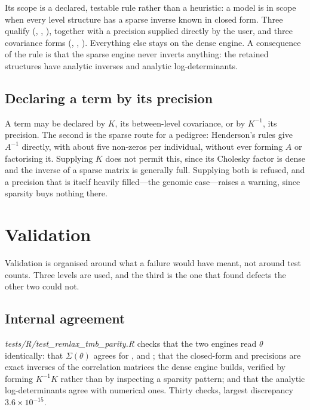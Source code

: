 \documentclass[article]{jss}
\begin{document}
Its scope is a declared, testable rule rather than a heuristic: a model is in
scope when every level structure has a sparse inverse known in closed form.
Three qualify (, , ), together with a
precision supplied directly by the user, and three covariance forms
(, , ). Everything else stays on the dense
engine. A consequence of the rule is that the sparse engine never inverts
anything: the retained structures have analytic inverses and analytic
log-determinants.

\subsection{Declaring a term by its precision}

A term may be declared by $K$, its between-level covariance, or by $K^{-1}$,
its precision. The second is the sparse route for a pedigree: Henderson's
rules give $A^{-1}$ directly, with about five non-zeros per individual,
without ever forming $A$ or factorising it. Supplying $K$ does not permit
this, since its Cholesky factor is dense and the inverse of a sparse matrix is
generally full. Supplying both is refused, and a precision that is itself
heavily filled---the genomic case---raises a warning, since sparsity buys
nothing there.

\section{Validation}\label{sec:validation}


Validation is organised around what a failure would have meant, not around
test counts. Three levels are used, and the third is the one that found
defects the other two could not.

\subsection{Internal agreement}

\emph{tests/R/test\_remlax\_tmb\_parity.R} checks that the two engines read
$\theta$ identically: that $\Sigma(\theta)$ agrees for ,
 and ; that the closed-form  and 
precisions are exact inverses of the correlation matrices the dense engine
builds, verified by forming $K^{-1}K$ rather than by inspecting a sparsity
pattern; and that the analytic log-determinants agree with numerical ones.
Thirty checks, largest discrepancy $3.6 \times 10^{-15}$.
\end{document}

